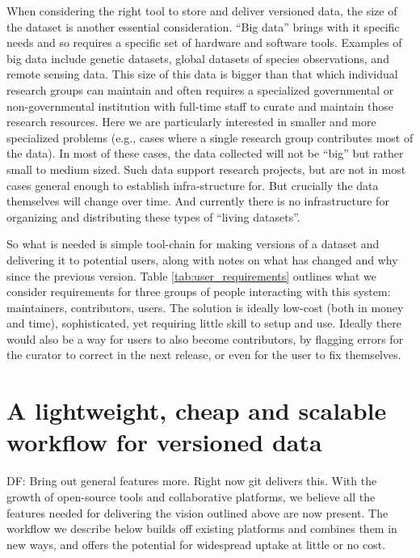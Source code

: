 \documentclass[a4paper,11pt]{article}
\begin{document}
When considering the right tool to store and deliver versioned data, the size
of the dataset is another essential consideration. ``Big data'' brings with it
specific needs and so requires a specific set of hardware and software tools.
Examples of big data include genetic datasets, global datasets of species
observations, and remote sensing data. This size of this data is bigger than
that which individual research groups can maintain and often requires a
specialized governmental or non-governmental institution with full-time staff
to curate and maintain those research resources. Here we are particularly
interested in smaller and more specialized problems (e.g., cases where a single 
research group contributes most of the data). In most of these cases, the data
collected will not be ``big'' but rather small to medium sized. Such data
support research projects, but are not in most cases general enough to
establish infra-structure for. But crucially the data themselves will change
over time. And currently there is no infrastructure for organizing and
distributing these types of ``living datasets''.

So what is needed is simple tool-chain for
making versions of a dataset and delivering it to potential users, along
with notes on what has changed and why since the previous version.
Table \ref{tab:user_requirements} outlines what we consider requirements for
three groups of people interacting with this system: maintainers,
contributors, users. The solution is ideally low-cost (both in money and
time), sophisticated, yet requiring little skill to setup and use.  Ideally
there would also be a way for users to also become contributors, by flagging
errors for the curator to correct in the next release, or even for the user to
fix themselves.


\section{A lightweight, cheap and scalable workflow for versioned data}

DF: Bring out general features more. Right now git delivers this.
With the growth of open-source tools and collaborative platforms, we believe
all the features needed for delivering the vision outlined above are now
present. The workflow we describe below builds off existing platforms and
combines them in new ways, and offers the potential for
widespread uptake at little or no cost.
\end{document}
